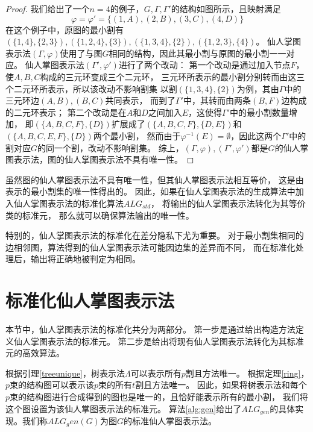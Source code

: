 \begin{proof}
我们给出了一个$n=4$的例子，$G,\Gamma,\Gamma'$的结构如图所示，且映射满足
\begin{equation*}
  \varphi=\varphi'=\{(1,A),(2,B),(3,C),(4,D)\}
\end{equation*}
在这个例子中，原图的最小割有$(\{1,4\},\{2,3\}),(\{1,2,4\},\{3\}),(\{1,3,4\},\{2\}),(\{1,2,3\},\{4\})$。
仙人掌图表示法$(\Gamma,\varphi)$使用了与图$G$相同的结构，因此其最小割与原图的最小割一一对应。
仙人掌图表示法$(\Gamma',\varphi')$进行了两个改动：
第一个改动是通过加入节点$F$，使$A,B,C$构成的三元环变成三个二元环，
三元环所表示的最小割分别转而由这三个二元环所表示，所以该改动不影响割集
以割$(\{1,3,4\},\{2\})$为例，其由$\Gamma$中的三元环边$(A,B),(B,C)$共同表示，
而到了$\Gamma'$中，其转而由两条$(B,F)$边构成的二元环表示；
第二个改动是在$A$和$D$之间加入$E$，这使得$\Gamma'$中的最小割数量增加，
即$(\{A,B,C,F\},\{D\})$扩展成了$(\{A,B,C,F\},\{D,E\})$和$(\{A,B,C,E,F\},\{D\})$两个最小割，
然而由于$\varphi^{-1}(E)=\emptyset$，因此这两个$\Gamma'$中的割对应$G$的同一个割，改动不影响割集。
综上，$(\Gamma,\varphi),(\Gamma',\varphi')$都是$G$的仙人掌图表示法，图的仙人掌图表示法不具有唯一性。
\end{proof}

虽然图的仙人掌图表示法不具有唯一性，但其仙人掌图表示法相互等价，
这是由表示的最小割集的唯一性得出的。
因此，如果在仙人掌图表示法的生成算法中加入仙人掌图表示法的标准化算法$ALG_{std}$，
将输出的仙人掌图表示法转化为其等价类的标准元，
那么就可以确保算法输出的唯一性。

特别的，仙人掌图表示法的标准化在差分隐私下尤为重要。
对于最小割集相同的边相邻图，算法得到的仙人掌图表示法可能因边集的差异而不同，
而在标准化处理后，输出将正确地被判定为相同。

\section{标准化仙人掌图表示法}

本节中，仙人掌图表示法的标准化共分为两部分。
第一步是通过给出构造方法定义仙人掌图表示法的标准元。
第二步是给出将现有仙人掌图表示法转化为其标准元的高效算法。

根据引理\ref{treeunique}，树表示法$\Lambda$可以表示所有$p$割且方法唯一。
根据定理\ref{ring}，$p$束的结构图可以表示该$p$束的所有$t$割且方法唯一。
因此，如果将树表示法和每个$p$束的结构图进行合成得到的图也是唯一的，且恰好能表示所有的最小割，
我们将这个图设置为该仙人掌图表示法的标准元。
算法\ref{alg:gen}给出了$ALG_{gen}$的具体实现。我们称$ALG_gen(G)$为图$G$的标准仙人掌图表示法。

